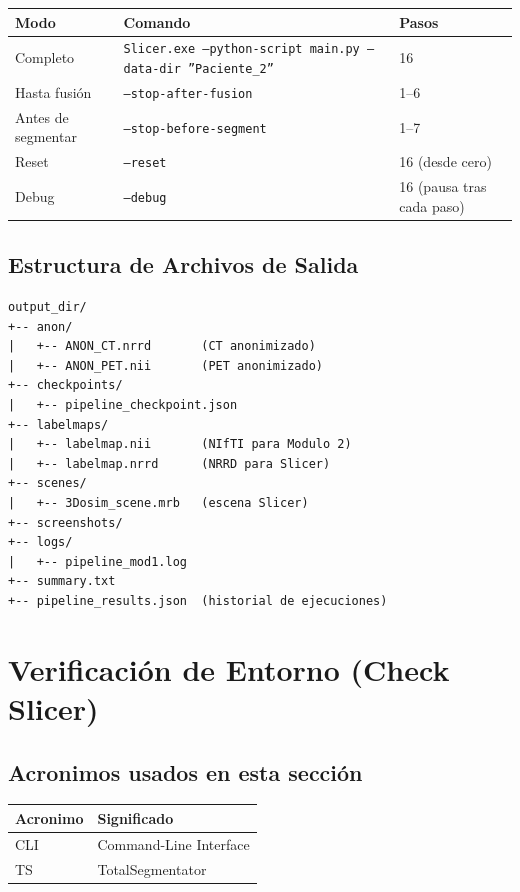 \documentclass[12pt,a4paper]{article}
\begin{document}
\begin{table}[H]
\centering
\small
\begin{tabular}{p{2.8cm} p{7.5cm} p{2.2cm}}
\toprule
\textbf{Modo} & \textbf{Comando} & \textbf{Pasos} \\
\midrule
Completo & \texttt{Slicer.exe --python-script main.py --data-dir ''Paciente\_2''} & 16 \\
Hasta fusión & \texttt{--stop-after-fusion} & 1--6 \\
Antes de segmentar & \texttt{--stop-before-segment} & 1--7 \\
Reset & \texttt{--reset} & 16 (desde cero) \\
Debug & \texttt{--debug} & 16 (pausa tras cada paso) \\
\bottomrule
\end{tabular}
\end{table}

\subsection{Estructura de Archivos de Salida}

\begin{lstlisting}
output_dir/
+-- anon/
|   +-- ANON_CT.nrrd       (CT anonimizado)
|   +-- ANON_PET.nii       (PET anonimizado)
+-- checkpoints/
|   +-- pipeline_checkpoint.json
+-- labelmaps/
|   +-- labelmap.nii       (NIfTI para Modulo 2)
|   +-- labelmap.nrrd      (NRRD para Slicer)
+-- scenes/
|   +-- 3Dosim_scene.mrb   (escena Slicer)
+-- screenshots/
+-- logs/
|   +-- pipeline_mod1.log
+-- summary.txt
+-- pipeline_results.json  (historial de ejecuciones)
\end{lstlisting}

\newpage

\section{Verificación de Entorno (Check Slicer)}
\label{sec:check}

\subsection*{Acronimos usados en esta sección}
\begin{tabular}{ll}
\toprule
\textbf{Acronimo} & \textbf{Significado} \\
\midrule
CLI & Command-Line Interface \\
TS & TotalSegmentator \\
\bottomrule
\end{tabular}
\end{document}
